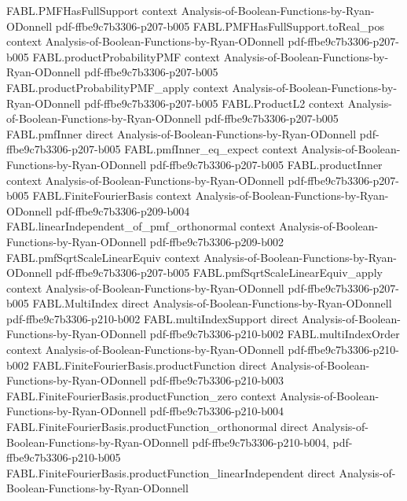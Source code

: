 \begin{theorem}
\proofstep
  {FABL.PMFHasFullSupport}
  {context}
  {Analysis-of-Boolean-Functions-by-Ryan-ODonnell}
  {pdf-ffbe9c7b3306-p207-b005}
\proofstep
  {FABL.PMFHasFullSupport.toReal_pos}
  {context}
  {Analysis-of-Boolean-Functions-by-Ryan-ODonnell}
  {pdf-ffbe9c7b3306-p207-b005}
\proofstep
  {FABL.productProbabilityPMF}
  {context}
  {Analysis-of-Boolean-Functions-by-Ryan-ODonnell}
  {pdf-ffbe9c7b3306-p207-b005}
\proofstep
  {FABL.productProbabilityPMF_apply}
  {context}
  {Analysis-of-Boolean-Functions-by-Ryan-ODonnell}
  {pdf-ffbe9c7b3306-p207-b005}
\proofstep
  {FABL.ProductL2}
  {context}
  {Analysis-of-Boolean-Functions-by-Ryan-ODonnell}
  {pdf-ffbe9c7b3306-p207-b005}
\proofstep
  {FABL.pmfInner}
  {direct}
  {Analysis-of-Boolean-Functions-by-Ryan-ODonnell}
  {pdf-ffbe9c7b3306-p207-b005}
\proofstep
  {FABL.pmfInner_eq_expect}
  {context}
  {Analysis-of-Boolean-Functions-by-Ryan-ODonnell}
  {pdf-ffbe9c7b3306-p207-b005}
\proofstep
  {FABL.productInner}
  {context}
  {Analysis-of-Boolean-Functions-by-Ryan-ODonnell}
  {pdf-ffbe9c7b3306-p207-b005}
\proofstep
  {FABL.FiniteFourierBasis}
  {context}
  {Analysis-of-Boolean-Functions-by-Ryan-ODonnell}
  {pdf-ffbe9c7b3306-p209-b004}
\proofstep
  {FABL.linearIndependent_of_pmf_orthonormal}
  {context}
  {Analysis-of-Boolean-Functions-by-Ryan-ODonnell}
  {pdf-ffbe9c7b3306-p209-b002}
\proofstep
  {FABL.pmfSqrtScaleLinearEquiv}
  {context}
  {Analysis-of-Boolean-Functions-by-Ryan-ODonnell}
  {pdf-ffbe9c7b3306-p207-b005}
\proofstep
  {FABL.pmfSqrtScaleLinearEquiv_apply}
  {context}
  {Analysis-of-Boolean-Functions-by-Ryan-ODonnell}
  {pdf-ffbe9c7b3306-p207-b005}
\proofstep
  {FABL.MultiIndex}
  {direct}
  {Analysis-of-Boolean-Functions-by-Ryan-ODonnell}
  {pdf-ffbe9c7b3306-p210-b002}
\proofstep
  {FABL.multiIndexSupport}
  {direct}
  {Analysis-of-Boolean-Functions-by-Ryan-ODonnell}
  {pdf-ffbe9c7b3306-p210-b002}
\proofstep
  {FABL.multiIndexOrder}
  {context}
  {Analysis-of-Boolean-Functions-by-Ryan-ODonnell}
  {pdf-ffbe9c7b3306-p210-b002}
\proofstep
  {FABL.FiniteFourierBasis.productFunction}
  {direct}
  {Analysis-of-Boolean-Functions-by-Ryan-ODonnell}
  {pdf-ffbe9c7b3306-p210-b003}
\proofstep
  {FABL.FiniteFourierBasis.productFunction_zero}
  {context}
  {Analysis-of-Boolean-Functions-by-Ryan-ODonnell}
  {pdf-ffbe9c7b3306-p210-b004}
\proofstep
  {FABL.FiniteFourierBasis.productFunction_orthonormal}
  {direct}
  {Analysis-of-Boolean-Functions-by-Ryan-ODonnell}
  {pdf-ffbe9c7b3306-p210-b004,
    pdf-ffbe9c7b3306-p210-b005}
\proofstep
  {FABL.FiniteFourierBasis.productFunction_linearIndependent}
  {direct}
  {Analysis-of-Boolean-Functions-by-Ryan-ODonnell}

\end{theorem}
